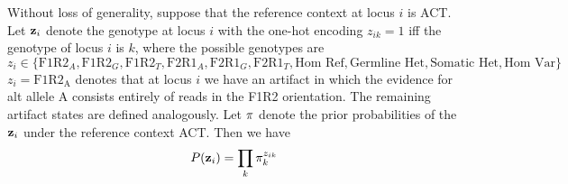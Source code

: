 \documentclass[nofootinbib,amssymb,amsmath]{revtex4}
\newcommand{\vz}{{\bf z}}
\newcommand{\vpi}{{\bf \pi}}
\begin{document}
Without loss of generality, suppose that the reference context at locus $i$ is ACT. Let $\vz_i$ denote the genotype at locus $i$ with the one-hot encoding $z_{ik} = 1$ iff the genotype of locus $i$ is $k$, where the possible genotypes are
\begin{equation*}
z_i \in \{ \text{F1R2}_A, \text{F1R2}_G, \text{F1R2}_T, \text{F2R1}_A, \text{F2R1}_G, \text{F2R1}_T,  \text{Hom Ref}, \text{Germline Het}, \text{Somatic Het}, \text{Hom Var} \}
\end{equation*}
$z_i = \mathrm{F1R2_A}$ denotes that at locus $i$ we have an artifact in which the evidence for alt allele A consists entirely of reads in the F1R2 orientation. The remaining artifact states are defined analogously. Let $\vpi$ denote the prior probabilities of the $\vz_i$ under the reference context ACT. Then we have 
\begin{equation}
P(\vz_i) = \prod_k \pi_{k}^{z_{ik}}
\end{equation}
\end{document}
